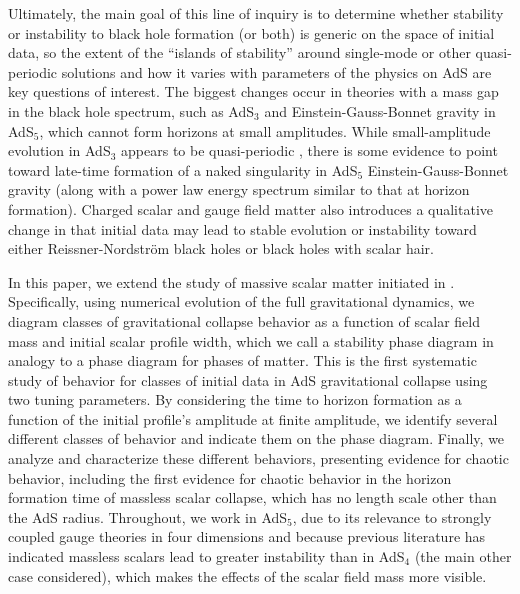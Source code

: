 \documentclass[../PhD.tex]{subfiles}
\begin{document}
Ultimately, the main goal of this line of inquiry is to determine whether
stability or instability to black hole formation (or both) is generic on
the space of initial data, so the extent of the ``islands of stability''
around single-mode or other quasi-periodic solutions and how it varies
with parameters of the physics on AdS are key questions of interest.  The
biggest changes occur in theories with a mass gap in the black hole spectrum,
such as AdS$_3$ and Einstein-Gauss-Bonnet gravity in AdS$_5$, which cannot
form horizons at small amplitudes.  While small-amplitude evolution in
AdS$_3$ appears to be quasi-periodic \cite{1306.0317,1412.6002}, there is
some evidence to point toward late-time formation of a naked singularity
in AdS$_5$ Einstein-Gauss-Bonnet gravity \cite{1608.05402,1410.1869}
(along with a power law energy spectrum similar to that at horizon
formation).  Charged scalar and gauge field matter \cite{1606.00830}
also introduces a qualitative change in that initial data may lead to
stable evolution or instability toward either Reissner-Nordstr\"om black holes
or black holes with scalar hair.

In this paper, we extend the study of massive scalar matter initiated in
\cite{1504.05203,1508.02709}.  Specifically, using numerical evolution of
the full gravitational dynamics, we diagram classes of gravitational
collapse behavior as a function of scalar field mass and initial scalar profile
width, which we call a stability phase diagram 
in analogy to a phase diagram for phases of matter.  
This is the first systematic study of behavior for classes of initial data
in AdS gravitational collapse using two tuning parameters.
By considering the time to horizon formation as a function of
the initial profile's amplitude at finite amplitude, 
we identify several different classes
of behavior and indicate them on the phase diagram.  Finally, we
analyze and characterize these different behaviors, presenting evidence for
chaotic behavior, including the first evidence for chaotic behavior in
the horizon formation time of
massless scalar collapse, which has no length scale other than the AdS
radius.  Throughout,
we work in AdS$_5$, due to its relevance to strongly coupled gauge theories
in four dimensions and because previous literature has indicated massless
scalars lead to greater instability than in AdS$_4$ (the main other case
considered), which makes the effects of the scalar field mass more visible.
\end{document}
